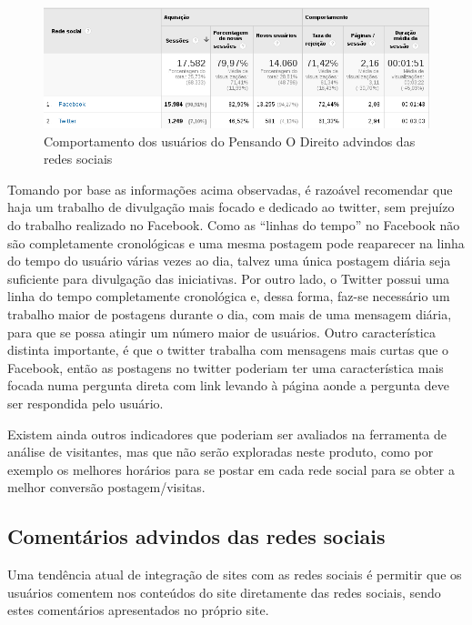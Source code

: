 \begin{figure}[htb]%
	\begin{center}
		\includegraphics[scale=0.55]{./imagens/comportamento-social.png}%
	\end{center}%
	\caption{Comportamento dos usuários do Pensando O Direito advindos das redes sociais\label{fig:comportamento-redes-sociais}}%
\end{figure}%

Tomando por base as informações acima observadas, é razoável recomendar que haja um trabalho de divulgação mais focado e dedicado ao twitter, sem prejuízo do trabalho realizado no Facebook. Como as ``linhas do tempo'' no Facebook não são completamente cronológicas e uma mesma postagem pode reaparecer na linha do tempo do usuário várias vezes ao dia, talvez uma única postagem diária seja suficiente para divulgação das iniciativas. Por outro lado, o Twitter possui uma linha do tempo completamente cronológica e, dessa forma, faz-se necessário um trabalho maior de postagens durante o dia, com mais de uma mensagem diária, para que se possa atingir um número maior de usuários. Outro característica distinta importante, é que o twitter trabalha com mensagens mais curtas que o Facebook, então as postagens no twitter poderiam ter uma característica mais focada numa pergunta direta com link levando à página aonde a pergunta deve ser respondida pelo usuário.

Existem ainda outros indicadores que poderiam ser avaliados na ferramenta de análise de visitantes, mas que não serão exploradas neste produto, como por exemplo os melhores horários para se postar em cada rede social para se obter a melhor conversão postagem/visitas.

\subsection{Comentários advindos das redes sociais}
Uma tendência atual de integração de sites com as redes sociais é permitir que os usuários comentem nos conteúdos do site diretamente das redes sociais, sendo estes comentários apresentados no próprio site.

